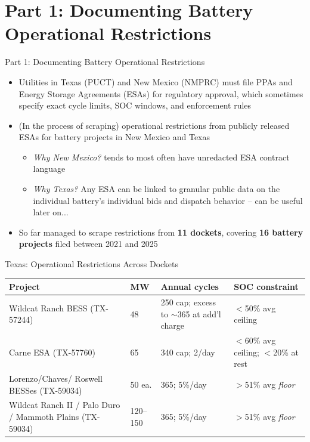 \documentclass{beamer}
\begin{document}
\section{Part 1: Documenting Battery Operational Restrictions}


\begin{frame}{Part 1: Documenting Battery Operational Restrictions}
\begin{itemize}
    \item Utilities in Texas (PUCT) and New Mexico (NMPRC) must file PPAs and Energy Storage Agreements (ESAs) for regulatory approval, which sometimes specify exact cycle limits, SOC windows, and enforcement rules
    \item (In the process of scraping) operational restrictions from publicly released ESAs for battery projects in New Mexico and Texas
    \begin{itemize}
        \item \textit{Why New Mexico?} tends to most often have unredacted ESA contract language
        \item \textit{Why Texas?} Any ESA can be linked to granular public data on the individual battery's individual bids and dispatch behavior -- can be useful later on...
    \end{itemize}
    \item So far managed to scrape restrictions from \textbf{11 dockets}, covering \textbf{16 battery projects} filed between 2021 and 2025
\end{itemize}
\end{frame}

\begin{frame}{Texas: Operational Restrictions Across Dockets}
\footnotesize
\begin{tabular}{p{3.5cm} p{0.9cm} p{2.0cm} p{2.5cm}}
\toprule
\textbf{Project} & \textbf{MW} & \textbf{Annual cycles} & \textbf{SOC constraint} \\
\midrule
Wildcat Ranch BESS (TX-57244) & 48 & 250 cap; excess to ${\sim}$365 at add'l charge & $<$50\% avg ceiling \\
\addlinespace
Carne ESA (TX-57760) & 65 & 340 cap; 2/day & $<$60\% avg ceiling; $<$20\% at rest \\
\addlinespace
Lorenzo/Chaves/ Roswell BESSes (TX-59034) & 50 ea. & 365; 5\%/day & $>$51\% avg \textit{floor}\\
\addlinespace
Wildcat Ranch II / Palo Duro / Mammoth Plains (TX-59034) & 120--150 & 365; 5\%/day & $>$51\% avg \textit{floor} \\
\bottomrule
\end{tabular}


\end{frame}
\end{document}
